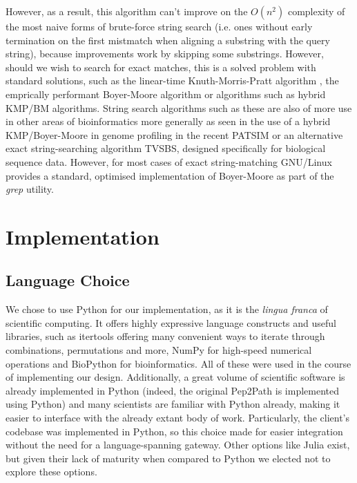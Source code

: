 \documentclass{l4proj}
\newcommand{\cit}[1]{\citep{#1}}
\begin{document}
However, as a result, this algorithm can't improve on the \(O(n^2)\) complexity of the most naive forms of brute-force string search (i.e. ones without early termination on the first mistmatch when aligning a substring with the query string), because improvements work by skipping some substrings. However, should we wish to search for exact matches, this is a solved problem with standard solutions, such as the linear-time Knuth-Morris-Pratt algorithm \cit{kmp}, the emprically performant Boyer-Moore algorithm \cit{boyer-moore} or algorithms such as hybrid KMP/BM algorithms. \cit{kmpbm} \cit{kmpbmtwo} String search algorithms such as these are also of more use in other areas of bioinformatics more generally as seen in the use of a hybrid KMP/Boyer-Moore in genome profiling in the recent PATSIM \cit{patsim} or an alternative exact string-searching algorithm TVSBS, \cit{tvsbs} designed specifically for biological sequence data. However, for most cases of exact string-matching GNU/Linux provides a standard, optimised implementation of Boyer-Moore as part of the \textit{grep} utility.

\chapter{Implementation}

\section{Language Choice}

We chose to use Python for our implementation, as it is the \textit{lingua franca} of scientific computing. It offers highly expressive language constructs and useful libraries, such as itertools \cit{itools} offering many convenient ways to iterate through combinations, permutations and more, NumPy \cit{numpy} for high-speed numerical operations and BioPython \cit{biopy} for bioinformatics. All of these were used in the course of implementing our design. Additionally, a great volume of scientific software is already implemented in Python (indeed, the original Pep2Path is implemented using Python) and many scientists are familiar with Python already, making it easier to interface with the already extant body of work. Particularly, the client's codebase was implemented in Python, so this choice made for easier integration without the need for a language-spanning gateway. Other options like Julia \cit{julia} exist, but given their lack of maturity when compared to Python we elected not to explore these options.
\end{document}
